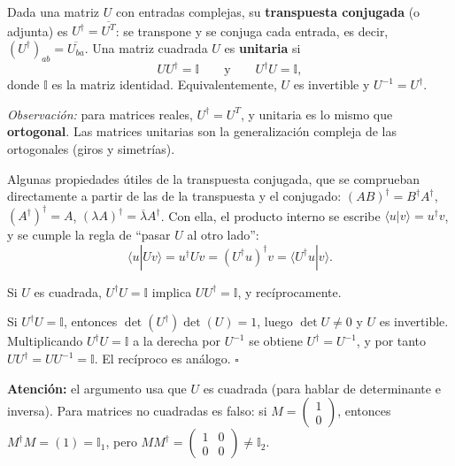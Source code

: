 \documentclass[11pt, a4paper, twoside, openright]{report}
\begin{document}
\begin{tcolorbox}[colback=teal!5!white,colframe=teal!75!black,title=\textbf{Definición: Matriz unitaria}]
Dada una matriz $U$ con entradas complejas, su \textbf{transpuesta conjugada} (o adjunta) es $U^\dagger = \overline{U^T}$: se transpone y se conjuga cada entrada, es decir, $(U^\dagger)_{ab} = \overline{U_{ba}}$. Una matriz cuadrada $U$ es \textbf{unitaria} si
\[ U U^\dagger = \mathbb{I} \qquad \text{y} \qquad U^\dagger U = \mathbb{I}, \]
donde $\mathbb{I}$ es la matriz identidad. Equivalentemente, $U$ es invertible y $U^{-1} = U^\dagger$.

\textit{Observación:} para matrices reales, $U^\dagger = U^T$, y unitaria es lo mismo que \textbf{ortogonal}. Las matrices unitarias son la generalización compleja de las ortogonales (giros y simetrías).
\end{tcolorbox}

\noindent Algunas propiedades útiles de la transpuesta conjugada, que se comprueban directamente a partir de las de la transpuesta y el conjugado: $(AB)^\dagger = B^\dagger A^\dagger$, $(A^\dagger)^\dagger = A$, $(\lambda A)^\dagger = \overline{\lambda} A^\dagger$. Con ella, el producto interno se escribe $\langle u|v\rangle = u^\dagger v$, y se cumple la regla de ``pasar $U$ al otro lado'':
\[ \langle u | U v\rangle = u^\dagger U v = (U^\dagger u)^\dagger v = \langle U^\dagger u | v\rangle. \]

\begin{tcolorbox}[colback=teal!5!white,colframe=teal!75!black,title=\textbf{Proposición: Basta una de las dos igualdades (para matrices cuadradas)}]
Si $U$ es cuadrada, $U^\dagger U = \mathbb{I}$ implica $UU^\dagger = \mathbb{I}$, y recíprocamente.
\end{tcolorbox}

\begin{tcolorbox}[colback=gray!5!white,colframe=gray!75!black,title=\textbf{Demostración}]
Si $U^\dagger U = \mathbb{I}$, entonces $\det(U^\dagger)\det(U) = 1$, luego $\det U \neq 0$ y $U$ es invertible. Multiplicando $U^\dagger U = \mathbb{I}$ a la derecha por $U^{-1}$ se obtiene $U^\dagger = U^{-1}$, y por tanto $UU^\dagger = UU^{-1} = \mathbb{I}$. El recíproco es análogo. \hfill $\square$

\textbf{Atención:} el argumento usa que $U$ es cuadrada (para hablar de determinante e inversa). Para matrices no cuadradas es falso: si $M = \begin{pmatrix} 1 \\ 0 \end{pmatrix}$, entonces $M^\dagger M = (1) = \mathbb{I}_1$, pero $MM^\dagger = \begin{pmatrix} 1 & 0 \\ 0 & 0\end{pmatrix} \neq \mathbb{I}_2$.
\end{tcolorbox}
\end{document}
